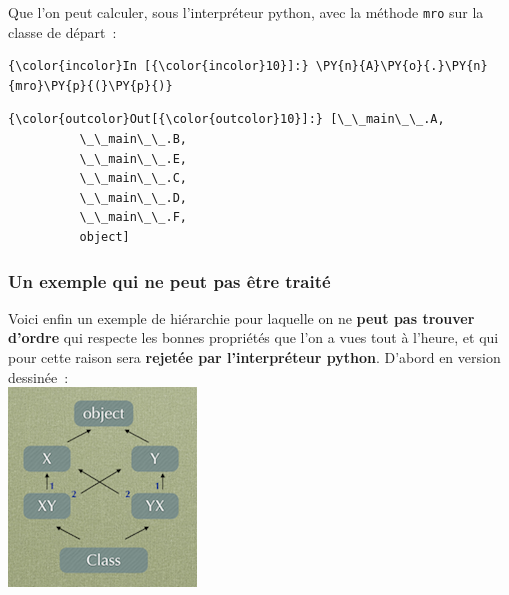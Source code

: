     Que l'on peut calculer, sous l'interpréteur python, avec la méthode
\texttt{mro} sur la classe de départ~:

    \begin{Verbatim}[commandchars=\\\{\}]
{\color{incolor}In [{\color{incolor}10}]:} \PY{n}{A}\PY{o}{.}\PY{n}{mro}\PY{p}{(}\PY{p}{)}
\end{Verbatim}


\begin{Verbatim}[commandchars=\\\{\}]
{\color{outcolor}Out[{\color{outcolor}10}]:} [\_\_main\_\_.A,
          \_\_main\_\_.B,
          \_\_main\_\_.E,
          \_\_main\_\_.C,
          \_\_main\_\_.D,
          \_\_main\_\_.F,
          object]
\end{Verbatim}
            
    \hypertarget{un-exemple-qui-ne-peut-pas-uxeatre-traituxe9}{%
\subsubsection{Un exemple qui ne peut pas être
traité}\label{un-exemple-qui-ne-peut-pas-uxeatre-traituxe9}}

    Voici enfin un exemple de hiérarchie pour laquelle on ne \textbf{peut
pas trouver d'ordre} qui respecte les bonnes propriétés que l'on a vues
tout à l'heure, et qui pour cette raison sera \textbf{rejetée par
l'interpréteur python}. D'abord en version dessinée~:\\

\includegraphics{medias/heritage-multiple02.png}

